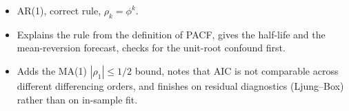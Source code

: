\begin{interviewq}

\goodgreat
\begin{itemize}
    \item {} AR(1), correct rule, $\rho_k = \phi^k$.
    \item {} Explains the rule from the definition of PACF, gives the half-life and the mean-reversion forecast, checks for the unit-root confound first.
    \item {} Adds the MA(1) $|\rho_1| \le 1/2$ bound, notes that AIC is not comparable across different differencing orders, and finishes on residual diagnostics (Ljung--Box) rather than on in-sample fit.
\end{itemize}

\end{interviewq}
